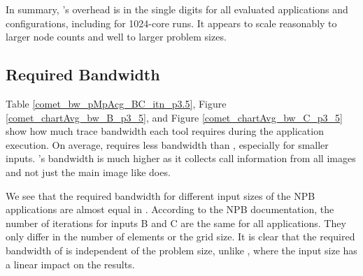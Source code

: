 In summary, \parlot 's overhead is in the single digits for all evaluated applications and configurations, including for 1024-core runs. It appears to scale reasonably to larger node counts and well to larger problem sizes.

\subsection{Required Bandwidth}
\label{subsec:lowbw}

Table \ref{comet_bw_pMpAcg_BC_itn_p3.5}, Figure  \ref{comet_chartAvg_bw_B_p3_5}, and Figure \ref{comet_chartAvg_bw_C_p3_5} show how much trace bandwidth each tool
requires
during the application execution.
%
On average, \parlotm requires less bandwidth than
\callgrind, especially for smaller inputs.
%
\parlota's bandwidth is much higher as it collects call information from all
images and not just the main image like \parlotm does.

We see that the required bandwidth for different input sizes of the NPB applications are almost equal in \parlot. According to the NPB documentation, the number of iterations for inputs B and C are the same for all applications. They only differ in the number of elements or the grid size. It is clear that the required bandwidth of \parlot is independent of the problem size, unlike \callgrind, where the input size has a linear impact on the results.



